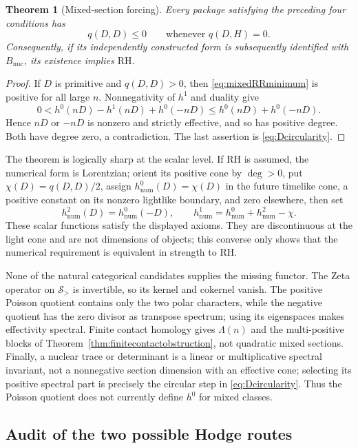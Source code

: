 \documentclass[11pt]{amsart}
\newtheorem{theorem}{Theorem}[section]
\theoremstyle{definition}
\theoremstyle{remark}
\newcommand{\RH}{\mathrm{RH}}
\begin{document}
\begin{theorem}[Mixed-section forcing]
\label{thm:mixedsectionforcing}
Every package satisfying the preceding four conditions has
\[
 q(D,D)\le0\qquad\text{whenever }q(D,H)=0.
\]
Consequently, if its independently constructed form is subsequently
identified with $B_{\mathrm{nuc}}$, its existence implies $\RH$.
\end{theorem}

\begin{proof}
If $D$ is primitive and $q(D,D)>0$, then
\eqref{eq:mixedRRminimum} is positive for all large $n$.  Nonnegativity of
$h^1$ and duality give
\[
 0<h^0(nD)-h^1(nD)+h^0(-nD)
 \le h^0(nD)+h^0(-nD).
\]
Hence $nD$ or $-nD$ is nonzero and strictly effective, and so has positive
degree.  Both have degree zero, a contradiction.  The last assertion is
\eqref{eq:Dcircularity}.
\end{proof}

The theorem is logically sharp at the scalar level.  If $\RH$ is assumed,
the numerical form is Lorentzian; orient its positive cone by $\deg>0$, put
$\chi(D)=q(D,D)/2$, assign $h^0_{\mathrm{num}}(D)=\chi(D)$ in the future
timelike cone, a positive constant on its nonzero lightlike boundary, and
zero elsewhere, then set
\[
 h^2_{\mathrm{num}}(D)=h^0_{\mathrm{num}}(-D),\qquad
 h^1_{\mathrm{num}}=h^0_{\mathrm{num}}+h^2_{\mathrm{num}}-\chi.
\]
These scalar functions satisfy the displayed axioms.  They are discontinuous
at the light cone and are not dimensions of objects; this converse only
shows that the numerical requirement is equivalent in strength to $\RH$.

None of the natural categorical candidates supplies the missing functor.
The Zeta operator on $\mathcal S_>$ is invertible, so its kernel and cokernel
vanish.  The positive Poisson quotient contains only the two polar
characters, while the negative quotient has the zero divisor as transpose
spectrum; using its eigenspaces makes effectivity spectral.  Finite contact
homology gives $\Lambda(n)$ and the multi-positive blocks of
Theorem~\ref{thm:finitecontactobstruction}, not quadratic mixed sections.
Finally, a nuclear trace or determinant is a linear or multiplicative
spectral invariant, not a nonnegative section dimension with an effective
cone; selecting its positive spectral part is precisely the circular step
in \eqref{eq:Dcircularity}.  Thus the Poisson quotient does not currently define
$h^0$ for mixed classes.

\subsection{Audit of the two possible Hodge routes}
\end{document}
